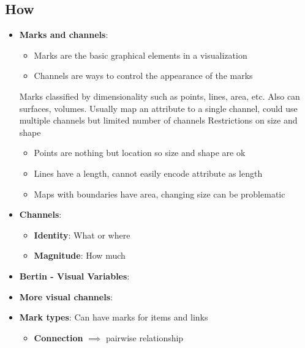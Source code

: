 \documentclass{report}
\begin{document}
    \subsection{How}
    \begin{itemize}
        \item \textbf{Marks and channels}:
            \begin{itemize}
                \item Marks are the basic graphical elements in a visualization
                \item Channels are ways to control the appearance of the marks
            \end{itemize}
            Marks classified by dimensionality such as points, lines, area, etc. Also can surfaces, volumes.
            \bigbreak \noindent 
            Usually map an attribute to a single channel, could use multiple channels but limited number of channels
            \bigbreak \noindent 
            Restrictions on size and shape
            \begin{itemize}
                \item Points are nothing but location so size and shape are ok
                \item Lines have a length, cannot easily encode attribute as length
                \item Maps with boundaries have area, changing size can be problematic
            \end{itemize}
            \bigbreak \noindent 
        \item \textbf{Channels}: 
            \bigbreak \noindent 
            \begin{itemize}
                \item \textbf{Identity}: What or where
                \item \textbf{Magnitude}: How much
            \end{itemize}
        \item \textbf{Bertin - Visual Variables}: 
            \bigbreak \noindent 
        \item \textbf{More visual channels}:
            \bigbreak \noindent 
        \item \textbf{Mark types}: Can have marks for items and links
            \begin{itemize}
                \item \textbf{Connection} $\implies$ pairwise relationship

\end{itemize}
\end{itemize}
\end{document}
